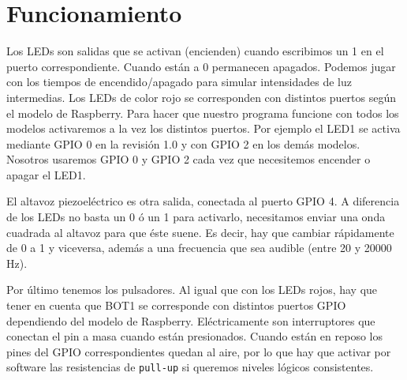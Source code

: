 \section{Funcionamiento}

Los LEDs son salidas que se activan (encienden) cuando escribimos un 1
en el puerto correspondiente. Cuando están a 0 permanecen apagados. Podemos
jugar con los tiempos de encendido/apagado para simular intensidades de luz
intermedias. Los LEDs de color rojo se corresponden con distintos puertos
según el modelo de Raspberry. Para hacer que nuestro programa funcione con
todos los modelos activaremos a la vez los distintos puertos. Por ejemplo
el LED1 se activa mediante GPIO 0 en la revisión 1.0 y con GPIO 2 en los demás
modelos. Nosotros usaremos GPIO 0 y GPIO 2 cada vez que necesitemos
encender o apagar el LED1.

El altavoz piezoeléctrico es otra salida, conectada al puerto GPIO 4. A diferencia
de los LEDs no basta un 0 ó un 1 para activarlo, necesitamos enviar una onda
cuadrada al altavoz para que éste suene. Es decir, hay que cambiar rápidamente de
0 a 1 y viceversa, además a una frecuencia que sea audible (entre 20 y 20000 Hz).

Por último tenemos los pulsadores. Al igual que con los LEDs rojos, hay que tener
en cuenta que BOT1 se corresponde con distintos puertos GPIO dependiendo del modelo
de Raspberry. Eléctricamente son interruptores que conectan el pin a masa cuando
están presionados. Cuando están en reposo los pines del GPIO correspondientes
quedan al aire, por lo que hay que activar por software las resistencias de
{\tt pull-up} si queremos niveles lógicos consistentes.

\chapterend
